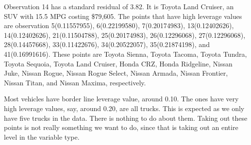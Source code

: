 \documentclass[a4 paper, 11 pt]{article}
\begin{document}
Observation 14 has a standard residual of 3.82. It is Toyota Land Cruiser, an SUV with 15.5 MPG costing \$79,605. The points that have high leverage values are observation 5(0.11557955), 6(0.22199580), 7(0.20174983), 13(0.12402626), 14(0.12402626), 21(0.11504788), 25(0.20174983), 26(0.12296068), 27(0.12296068), 28(0.14457668), 33(0.11422676), 34(0.20522057), 35(0.21874198), and 41(0.16991616). These points are Toyota Sienna, Toyota Tacoma, Toyota Tundra, Toyota Sequoia, Toyota Land Cruiser, Honda CRZ, Honda Ridgeline, Nissan Juke, Nissan Rogue, Nissan Rogue Select, Nissan Armada, Nissan Frontier, Nissan Titan, and Nissan Maxima, respectively.

Most vehicles have border line leverage value, around 0.10. The ones have very high leverage values, say, around 0.20, are all trucks. This is expected as we only have five trucks in the data. There is nothing to do about them. Taking out these points is not really something we want to do, since that is taking out an entire level in the variable type.
\end{document}
